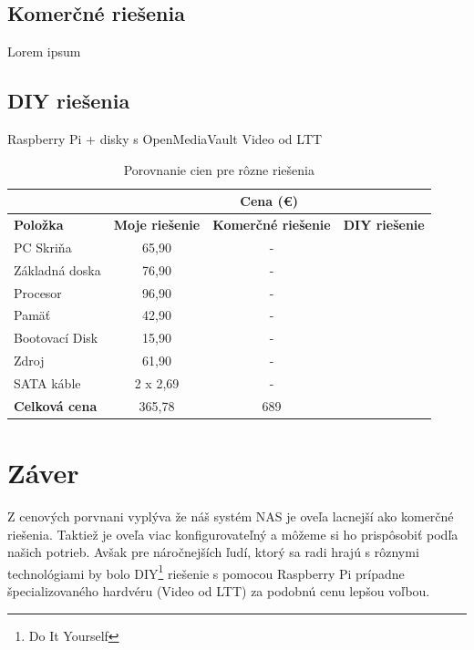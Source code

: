 \documentclass[12pt,oneside,slovak,a4paper]{article}
\begin{document}
\subsection{Komerčné riešenia}
Lorem ipsum

\subsection{DIY riešenia}
Raspberry Pi + disky s OpenMediaVault
Video od LTT



\begin{table}[h]
\centering
\begin{tabular}{|l|c|c|c|}
\hline & \multicolumn{3}{c|}{\textbf{Cena (€)}} \\ \hline
\textbf{Položka} & \textbf{Moje riešenie} & \textbf{Komerčné riešenie} & \textbf{DIY riešenie} \\ \hline
PC Skriňa & 65,90 & - &  \\ \hline
Základná doska & 76,90 & - &  \\ \hline
Procesor & 96,90 & - &  \\ \hline
Pamäť & 42,90 & - &  \\ \hline
Bootovací Disk & 15,90 & - &  \\ \hline
Zdroj & 61,90 & - &  \\ \hline
SATA káble & 2 x 2,69 & - &  \\ \hline
\textbf{Celková cena} & 365,78 & 689 &  \\ \hline
\end{tabular}
\caption{Porovnanie cien pre rôzne riešenia}
\end{table}


\section{Záver}
Z cenových porvnani vyplýva že náš systém NAS je oveľa lacnejší ako komerčné riešenia. Taktiež je oveľa viac konfigurovateľný a môžeme si ho prispôsobiť podľa našich potrieb. Avšak pre náročnejších ľudí, ktorý sa radi hrajú s rôznymi technológiami by bolo DIY\footnote{Do It Yourself} riešenie s pomocou Raspberry Pi prípadne špecializovaného hardvéru (Video od LTT) za podobnú cenu lepšou voľbou.




\end{document}
